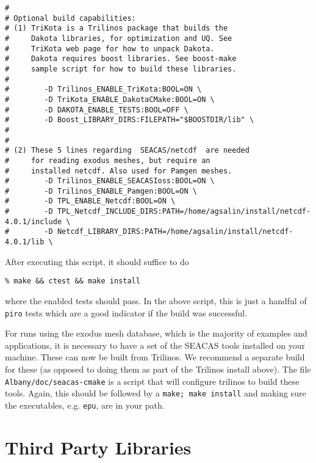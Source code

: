 \documentclass[pdf,12pt,report,strict]{SANDreport}
\theoremstyle{remark}
\begin{document}
\begin{verbatim}
#
# Optional build capabilities:
# (1) TriKota is a Trilinos package that builds the
#     Dakota libraries, for optimization and UQ. See
#     TriKota web page for how to unpack Dakota.
#     Dakota requires boost libraries. See boost-make
#     sample script for how to build these libraries.
#
#        -D Trilinos_ENABLE_TriKota:BOOL=ON \
#        -D TriKota_ENABLE_DakotaCMake:BOOL=ON \
#        -D DAKOTA_ENABLE_TESTS:BOOL=OFF \
#        -D Boost_LIBRARY_DIRS:FILEPATH="$BOOSTDIR/lib" \
#
#
# (2) These 5 lines regarding  SEACAS/netcdf  are needed
#     for reading exodus meshes, but require an
#     installed netcdf. Also used for Pamgen meshes.
#        -D Trilinos_ENABLE_SEACASIoss:BOOL=ON \
#        -D Trilinos_ENABLE_Pamgen:BOOL=ON \
#        -D TPL_ENABLE_Netcdf:BOOL=ON \
#        -D TPL_Netcdf_INCLUDE_DIRS:PATH=/home/agsalin/install/netcdf-4.0.1/include \
#        -D Netcdf_LIBRARY_DIRS:PATH=/home/agsalin/install/netcdf-4.0.1/lib \
\end{verbatim}

After executing this script, it should suffice to do
\begin{verbatim}
% make && ctest && make install
\end{verbatim}
where the enabled tests should pass. In the above script, this is
just a handful of \texttt{piro} tests which are a good indicator
if the build was successful.

For runs using the exodus mesh database, which is the majority of
examples and applications, it is necessary to have a set of the
SEACAS tools installed on your machine. These can now be built
from Trilinos. We recommend a separate build for these (as opposed
to doing them as part of the Trilinos install above). The file 
\texttt{Albany/doc/seacas-cmake} is a script that will configure 
trilinos to build these tools.  Again, this should be followed
by a  \texttt{make; make install} and making sure the executables,
e.g. \texttt{epu}, are in your path.


\section{Third Party Libraries}
\end{document}
